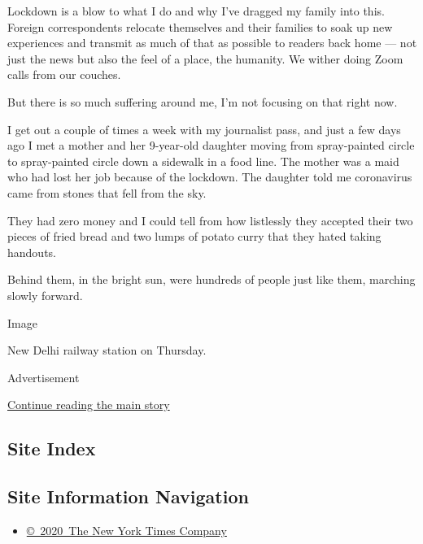 Lockdown is a blow to what I do and why I've dragged my family into
this. Foreign correspondents relocate themselves and their families to
soak up new experiences and transmit as much of that as possible to
readers back home --- not just the news but also the feel of a place,
the humanity. We wither doing Zoom calls from our couches.

But there is so much suffering around me, I'm not focusing on that right
now.

I get out a couple of times a week with my journalist pass, and just a
few days ago I met a mother and her 9-year-old daughter moving from
spray-painted circle to spray-painted circle down a sidewalk in a food
line. The mother was a maid who had lost her job because of the
lockdown. The daughter told me coronavirus came from stones that fell
from the sky.

They had zero money and I could tell from how listlessly they accepted
their two pieces of fried bread and two lumps of potato curry that they
hated taking handouts.

Behind them, in the bright sun, were hundreds of people just like them,
marching slowly forward.

Image

New Delhi railway station on Thursday.

Advertisement

\protect\hyperlink{after-bottom}{Continue reading the main story}

\hypertarget{site-index}{%
\subsection{Site Index}\label{site-index}}

\hypertarget{site-information-navigation}{%
\subsection{Site Information
Navigation}\label{site-information-navigation}}

\begin{itemize}
\tightlist
\item
  \href{https://help.nytimes.com/hc/en-us/articles/115014792127-Copyright-notice}{©~2020~The
  New York Times Company}
\end{itemize}

